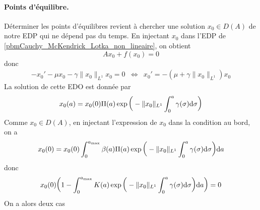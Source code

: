\paragraph{Points d'équilibre.} Déterminer les points d'équilibres revient à chercher une solution $x_0 \in D(A)$ de notre EDP qui ne dépend pas du temps. En injectant $x_0$ dans l'EDP de \eqref{pbmCauchy_McKendrick_Lotka_non_lineaire}, on obtient 
\begin{equation*}
    Ax_0+f(x_0) = 0
\end{equation*}
donc 
\begin{eqnarray*}
    -x_0'-\mu x_0 -\gamma \|x_0\|_{L^1}x_0 = 0 &\iff& x_0' = -(\mu + \gamma \|x_0\|_{L^1})x_0
\end{eqnarray*}
La solution de cette EDO est donnée par 
\begin{equation*}
    x_0(a) = x_0(0)\Pi(a)\exp\bigg(-\|x_0\|_{L^1}\int_0^a\gamma(\sigma)\mathrm{d} \sigma\bigg)
\end{equation*}
Comme $x_0 \in D(A)$, en injectant l'expression de $x_0$ dans la condition au bord, on a
\begin{eqnarray*}
    x_0(0) = x_0(0)\int_0^{a_{\max}}\beta(a)\Pi(a)\exp\bigg(-\|x_0\|_{L^1}\int_0^a\gamma(\sigma)\mathrm{d} \sigma\bigg)\mathrm{d} a 
\end{eqnarray*}
donc 
\begin{equation*}
    x_0(0)\bigg(1-\int_0^{a_{\max}}K(a)\exp\bigg(-\|x_0\|_{L^1}\int_0^a \gamma(\sigma)\mathrm{d} \sigma\bigg)\mathrm{d} a\bigg) = 0
\end{equation*}
On a alors deux cas
